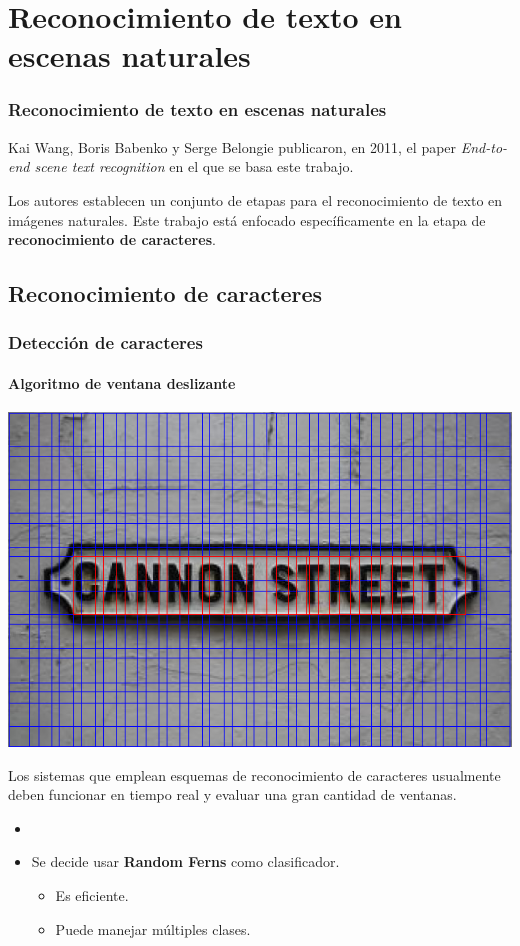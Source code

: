 \section{Reconocimiento de texto en escenas naturales}
	\begin{frame}
		\frametitle{Reconocimiento de texto en escenas naturales}
		Kai Wang, Boris Babenko y Serge Belongie publicaron, en 2011, el paper \textit{End-to-end scene text recognition} en el que se basa este trabajo.
		
		Los autores establecen un conjunto de etapas para el reconocimiento de texto en imágenes naturales. Este trabajo está enfocado específicamente en la etapa de \textbf{reconocimiento de caracteres}.
	\end{frame}
	\subsection{Reconocimiento de caracteres}
		\begin{frame}
			\frametitle{Detección de caracteres}
			\framesubtitle{Algoritmo de ventana deslizante}
			\begin{center}
				\includegraphics[height=0.65\paperheight]{imgs/ventana_deslizante.png}
			\end{center}
		\end{frame}
		\begin{frame}
			Los sistemas que emplean esquemas de reconocimiento de caracteres usualmente deben funcionar en tiempo real y evaluar una gran cantidad de ventanas.
			\begin{itemize}
				\item<1->[]
				\item<2->[] Se decide usar \textbf{Random Ferns} como clasificador.
					\begin{itemize}
						\item<2-> Es eficiente.
						\item<3-> Puede manejar múltiples clases.
					\end{itemize}
			\end{itemize}
		\end{frame}
